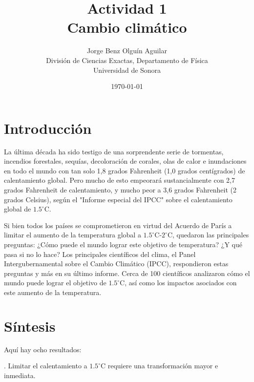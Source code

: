 \documentclass[12pt,a4paper]{article}
\begin{document}
\title{Actividad 1\\ Cambio climático  }
\author{
 Jorge Benz Olguín Aguilar\\
\small{División de Ciencias Exactas, Departamento de Física}\\
\small{Universidad de Sonora}\\
}
\date{\small{\today}}
\maketitle


\section{Introducción}

\noindent La última década ha sido testigo de una sorprendente serie de tormentas, incendios forestales, sequías, decoloración de corales, olas de calor e inundaciones en todo el mundo con tan solo 1,8 grados Fahrenheit (1,0 grados centígrados) de calentamiento global.  Pero mucho de esto empeorará sustancialmente con 2,7 grados Fahrenheit de calentamiento, y mucho peor a 3,6 grados Fahrenheit (2 grados Celsius), según el "Informe especial del IPCC" sobre el calentamiento global de $1.5^{\circ} $C.

\noindent Si bien todos los países se comprometieron en virtud del Acuerdo de París a limitar el aumento de la temperatura global a $1.5^{\circ} $C-$2^{\circ} $C, quedaron las principales preguntas: ¿Cómo puede el mundo lograr este objetivo de temperatura? ¿Y qué pasa si no lo hace?
\noindent Los principales científicos del clima, el Panel Intergubernamental sobre el Cambio Climático (IPCC), respondieron estas preguntas y más en su último informe. Cerca de 100 científicos analizaron cómo el mundo puede lograr el objetivo de $1.5^{\circ} $C, así como los impactos asociados con este aumento de la temperatura.

\section{Síntesis}

\noindent Aquí hay ocho resultados:

. Limitar el calentamiento a $1.5^{\circ} $C requiere una transformación mayor e inmediata.
\end{document}
